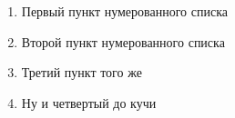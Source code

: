 \documentclass[a4paper,12pt]{article}
\begin{document}
\begin{enumerate}
  \item{Первый пункт нумерованного списка}
  \item{Второй пункт нумерованного списка}
  \item{Третий пункт того же}
  \item{Ну и четвертый до кучи}
\end{enumerate}
\end{document}
